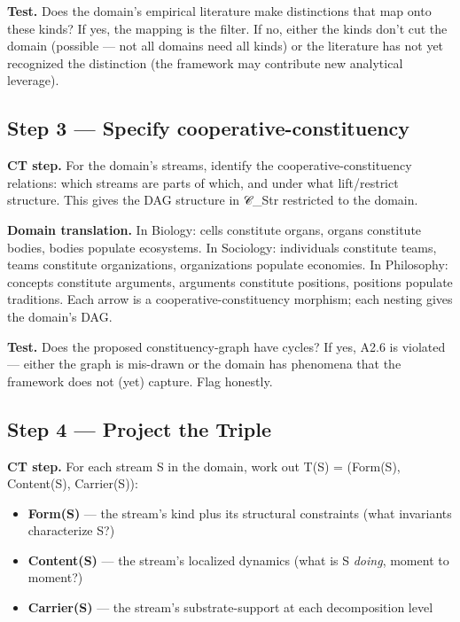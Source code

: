 \documentclass[11pt, openany]{book}
\begin{document}
\textbf{Test.} Does the domain's empirical literature make distinctions that map onto these kinds? If yes, the mapping is the filter. If no, either the kinds don't cut the domain (possible --- not all domains need all kinds) or the literature has not yet recognized the distinction (the framework may contribute new analytical leverage).

\subsection{Step 3 --- Specify cooperative-constituency}

\textbf{CT step.} For the domain's streams, identify the cooperative-constituency relations: which streams are parts of which, and under what lift/restrict structure. This gives the DAG structure in 𝒞\_\allowbreak{}Str restricted to the domain.

\textbf{Domain translation.} In Biology: cells constitute organs, organs constitute bodies, bodies populate ecosystems. In Sociology: individuals constitute teams, teams constitute organizations, organizations populate economies. In Philosophy: concepts constitute arguments, arguments constitute positions, positions populate traditions. Each arrow is a cooperative-constituency morphism; each nesting gives the domain's DAG.

\textbf{Test.} Does the proposed constituency-graph have cycles? If yes, A2.6 is violated --- either the graph is mis-drawn or the domain has phenomena that the framework does not (yet) capture. Flag honestly.

\subsection{Step 4 --- Project the Triple}

\textbf{CT step.} For each stream S in the domain, work out T(S) = (Form(S), Content(S), Carrier(S)):

\begin{itemize}
\item \textbf{Form(S)} --- the stream's kind plus its structural constraints (what invariants characterize S?)
\item \textbf{Content(S)} --- the stream's localized dynamics (what is S \textit{doing}, moment to moment?)
\item \textbf{Carrier(S)} --- the stream's substrate-support at each decomposition level
\end{itemize}
\end{document}
